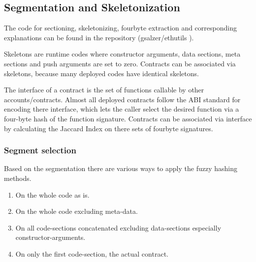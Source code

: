 \documentclass[../main.tex]{subfiles}
\begin{document}
\subsection{Segmentation and Skeletonization}

The code for sectioning, skeletonizing, fourbyte extraction and corresponding explanations can be found in the repository (gsalzer/ethutils \cite{ethutils}).

Skeletons are runtime codes where constructor arguments, data sections, meta sections and push arguments are set to zero.
Contracts can be associated via skeletons, because many deployed codes have identical skeletons.

The interface of a contract is the set of functions callable by other accounts/contracts.
Almost all deployed contracts follow the ABI standard for encoding there interface, which lets the caller select the desired function via a four-byte hash of the function signature.
Contracts can be associated via interface by calculating the Jaccard Index on there sets of fourbyte signatures.



\subsubsection{Segment selection}
Based on the segmentation there are various ways to apply the fuzzy hashing methods.

\begin{enumerate}
\item On the whole code as is.
\item On the whole code excluding meta-data.
\item On all code-sections concatenated excluding data-sections especially constructor-arguments.
\item On only the first code-section, the actual contract.
\end{enumerate}
\end{document}
